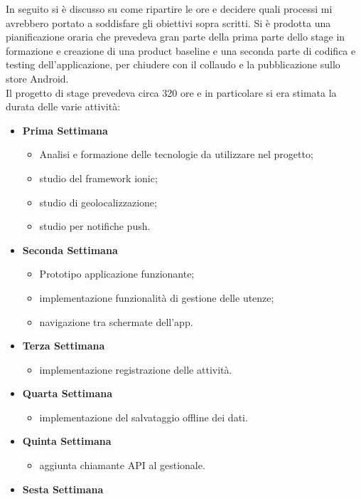 In seguito si è discusso su come ripartire le ore e decidere quali processi mi avrebbero portato a soddisfare gli obiettivi sopra scritti.
Si è prodotta una pianificazione oraria che prevedeva gran parte della prima parte dello stage in formazione e creazione di una \gls{product
baseline} e una seconda parte di codifica e testing dell'applicazione, per chiudere con il collaudo e la pubblicazione sullo store Android.
\\
Il progetto di stage prevedeva circa 320 ore e in particolare si era stimata la durata delle varie attività:
\begin{itemize}
		\item \textbf{Prima Settimana}
		\begin{itemize}
				\item Analisi e formazione delle tecnologie da utilizzare nel progetto;
				\item studio del framework ionic;
				\item studio di geolocalizzazione;
				\item studio per notifiche push.
		\end{itemize}
		\item \textbf{Seconda Settimana}
		\begin{itemize}
			\item Prototipo applicazione funzionante;
			\item implementazione funzionalità di gestione delle utenze;
			\item navigazione tra schermate dell’app.
		\end{itemize}
		\item \textbf{Terza Settimana}
		\begin{itemize}
				\item implementazione registrazione delle attività.
		\end{itemize}
		\item \textbf{Quarta Settimana}
		\begin{itemize}
				\item implementazione del salvataggio offline dei dati.
		\end{itemize}
		\item \textbf{Quinta Settimana}
		\begin{itemize}
				\item aggiunta chiamante API al gestionale.
		\end{itemize}
		\item \textbf{Sesta Settimana}
		\begin{itemize}

\end{itemize}
\end{itemize}
